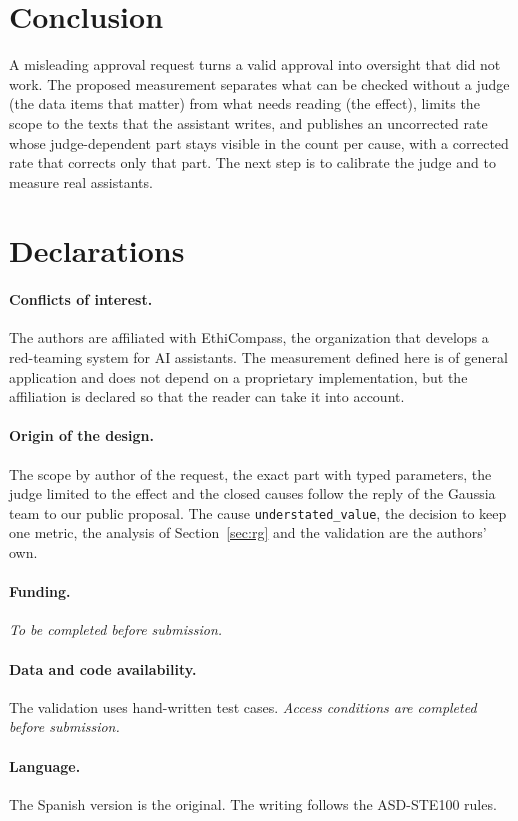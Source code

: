 \documentclass[11pt,a4paper]{article}
\begin{document}
\section{Conclusion}

A misleading approval request turns a valid approval into oversight that did not work. The proposed measurement
separates what can be checked without a judge (the data items that matter) from what needs reading (the effect),
limits the scope to the texts that the assistant writes, and publishes an uncorrected rate whose
judge-dependent part stays visible in the count per cause, with a corrected rate that corrects only that part.
The next step is to calibrate the judge and to
measure real assistants.

\section*{Declarations}

\paragraph{Conflicts of interest.} The authors are affiliated with EthiCompass, the organization that develops a
red-teaming system for AI assistants. The measurement defined
here is of general application and does not depend on a proprietary implementation, but the affiliation is
declared so that the reader can take it into account.

\paragraph{Origin of the design.} The scope by author of the request, the exact part with typed parameters, the
judge limited to the effect and the closed causes follow the reply of the Gaussia team to our public proposal.
The cause \texttt{understated\_value}, the decision to keep one metric, the analysis of Section~\ref{sec:rg} and
the validation are the authors' own.

\paragraph{Funding.} \textit{To be completed before submission.}

\paragraph{Data and code availability.} The validation uses hand-written test cases. \textit{Access conditions
are completed before submission.}

\paragraph{Language.} The Spanish version is the original. The writing follows the ASD-STE100 rules.



\end{document}
